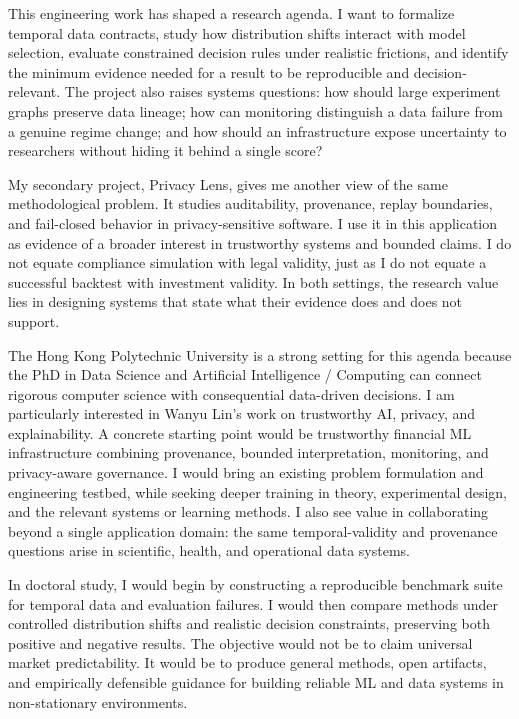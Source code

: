 \documentclass[11pt]{article}
\begin{document}
This engineering work has shaped a research agenda. I want to formalize temporal data contracts, study how distribution shifts interact with model selection, evaluate constrained decision rules under realistic frictions, and identify the minimum evidence needed for a result to be reproducible and decision-relevant. The project also raises systems questions: how should large experiment graphs preserve data lineage; how can monitoring distinguish a data failure from a genuine regime change; and how should an infrastructure expose uncertainty to researchers without hiding it behind a single score?

My secondary project, Privacy Lens, gives me another view of the same methodological problem. It studies auditability, provenance, replay boundaries, and fail-closed behavior in privacy-sensitive software. I use it in this application as evidence of a broader interest in trustworthy systems and bounded claims. I do not equate compliance simulation with legal validity, just as I do not equate a successful backtest with investment validity. In both settings, the research value lies in designing systems that state what their evidence does and does not support.

The Hong Kong Polytechnic University is a strong setting for this agenda because the PhD in Data Science and Artificial Intelligence / Computing can connect rigorous computer science with consequential data-driven decisions. I am particularly interested in Wanyu Lin's work on trustworthy AI, privacy, and explainability. A concrete starting point would be trustworthy financial ML infrastructure combining provenance, bounded interpretation, monitoring, and privacy-aware governance. I would bring an existing problem formulation and engineering testbed, while seeking deeper training in theory, experimental design, and the relevant systems or learning methods. I also see value in collaborating beyond a single application domain: the same temporal-validity and provenance questions arise in scientific, health, and operational data systems.

In doctoral study, I would begin by constructing a reproducible benchmark suite for temporal data and evaluation failures. I would then compare methods under controlled distribution shifts and realistic decision constraints, preserving both positive and negative results. The objective would not be to claim universal market predictability. It would be to produce general methods, open artifacts, and empirically defensible guidance for building reliable ML and data systems in non-stationary environments.
\end{document}
